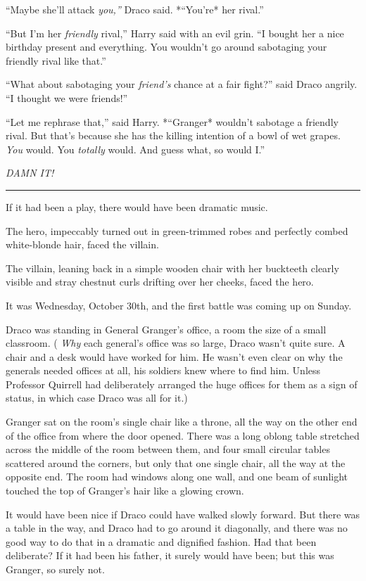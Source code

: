 ``Maybe she'll attack \emph{you,''} Draco said. *``You're* her rival.''

``But I'm her \emph{friendly} rival,'' Harry said with an evil grin. ``I
bought her a nice birthday present and everything. You wouldn't go
around sabotaging your friendly rival like that.''

``What about sabotaging your \emph{friend's} chance at a fair fight?''
said Draco angrily. ``I thought we were friends!''

``Let me rephrase that,'' said Harry. *``Granger* wouldn't sabotage a
friendly rival. But that's because she has the killing intention of a
bowl of wet grapes. \emph{You} would. You \emph{totally} would. And
guess what, so would I.''

\emph{DAMN IT!}

\begin{center}\rule{3in}{0.4pt}\end{center}

If it had been a play, there would have been dramatic music.

The hero, impeccably turned out in green-trimmed robes and perfectly
combed white-blonde hair, faced the villain.

The villain, leaning back in a simple wooden chair with her buckteeth
clearly visible and stray chestnut curls drifting over her cheeks, faced
the hero.

It was Wednesday, October 30th, and the first battle was coming up on
Sunday.

Draco was standing in General Granger's office, a room the size of a
small classroom. ( \emph{Why} each general's office was so large, Draco
wasn't quite sure. A chair and a desk would have worked for him. He
wasn't even clear on why the generals needed offices at all, his
soldiers knew where to find him. Unless Professor Quirrell had
deliberately arranged the huge offices for them as a sign of status, in
which case Draco was all for it.)

Granger sat on the room's single chair like a throne, all the way on the
other end of the office from where the door opened. There was a long
oblong table stretched across the middle of the room between them, and
four small circular tables scattered around the corners, but only that
one single chair, all the way at the opposite end. The room had windows
along one wall, and one beam of sunlight touched the top of Granger's
hair like a glowing crown.

It would have been nice if Draco could have walked slowly forward. But
there was a table in the way, and Draco had to go around it diagonally,
and there was no good way to do that in a dramatic and dignified
fashion. Had that been deliberate? If it had been his father, it surely
would have been; but this was Granger, so surely not.

